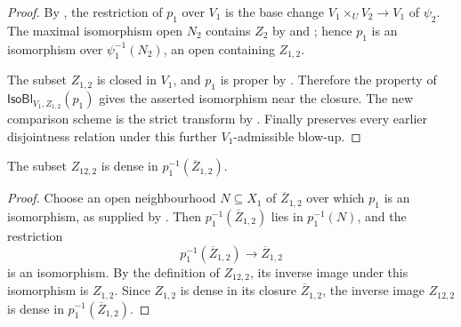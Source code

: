 \begin{proof}
  \leanok
  By , the restriction of
  $p_1$ over $V_1$ is the base change
  $V_1\times_UV_2\to V_1$ of $\psi_2$.  The maximal isomorphism open $N_2$
  contains $Z_2$ by  and
  ; hence $p_1$ is an
  isomorphism over $\psi_1^{-1}(N_2)$, an open containing $Z_{1,2}$.

  The subset $Z_{1,2}$ is closed in $V_1$, and $p_1$ is proper by
  .  Therefore the property
  of $\mathsf{IsoBl}_{V_1,Z_{1,2}}(p_1)$ gives the asserted isomorphism near
  the closure.  The new comparison scheme is the strict transform by
  .  Finally
   preserves every earlier
  disjointness relation under this further $V_1$-admissible blow-up.
\end{proof}


\begin{lemma}
  \label{lemma:nagata-comparison-boundary-density}
  \leanok

  The subset $Z_{12,2}$ is dense in
  $p_1^{-1}(\overline Z_{1,2})$.
\end{lemma}

\begin{proof}
  \leanok
  Choose an open neighbourhood $N\subseteq X_1$ of
  $\overline Z_{1,2}$ over which $p_1$ is an isomorphism, as supplied by
  .  Then
  $p_1^{-1}(\overline Z_{1,2})$ lies in $p_1^{-1}(N)$, and the restriction
  \[
    p_1^{-1}(\overline Z_{1,2})\longrightarrow\overline Z_{1,2}
  \]
  is an isomorphism.  By the definition of $Z_{12,2}$, its inverse image under
  this isomorphism is $Z_{1,2}$.  Since $Z_{1,2}$ is dense in its closure
  $\overline Z_{1,2}$, the inverse image $Z_{12,2}$ is dense in
  $p_1^{-1}(\overline Z_{1,2})$.
\end{proof}

